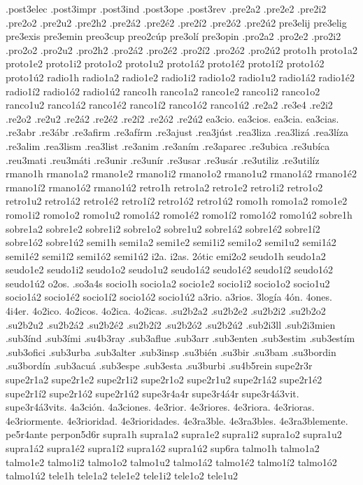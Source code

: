 {.post3elec
.post3impr
.post3ind
.post3ope
.post3rev
.pre2a2
.pre2e2
.pre2i2
.pre2o2
.pre2u2
.pre2h2
.pre2á2
.pre2é2
.pre2í2
.pre2ó2
.pre2ú2
pre3elij
pre3elig
pre3exis
pre3emin
preo3cup
preo2cúp
pre3olí
pre3opin
.pro2a2
.pro2e2
.pro2i2
.pro2o2
.pro2u2
.pro2h2
.pro2á2
.pro2é2
.pro2í2
.pro2ó2
.pro2ú2
proto1h
proto1a2 proto1e2 proto1i2 proto1o2 proto1u2
proto1á2 proto1é2 proto1í2 proto1ó2 proto1ú2
radio1h
radio1a2 radio1e2 radio1i2 radio1o2 radio1u2
radio1á2 radio1é2 radio1í2 radio1ó2 radio1ú2
ranco1h
ranco1a2 ranco1e2 ranco1i2 ranco1o2 ranco1u2
ranco1á2 ranco1é2 ranco1í2 ranco1ó2 ranco1ú2
.re2a2
.re3e4
.re2i2
.re2o2
.re2u2
.re2á2
.re2é2
.re2í2
.re2ó2
.re2ú2
ea3cio.
ea3cios.
ea3cia.
ea3cias.
.re3abr
.re3ábr
.re3afirm
.re3afírm
.re3ajust
.rea3júst
.rea3liza
.rea3lizá
.rea3líza
.re3alim
.rea3lism
.rea3list
.re3anim
.re3aním
.re3aparec
.re3ubica
.re3ubíca
.reu3mati
.reu3máti
.re3unir
.re3unír
.re3usar
.re3usár
.re3utiliz
.re3utilíz
rmano1h
rmano1a2 rmano1e2 rmano1i2 rmano1o2 rmano1u2
rmano1á2 rmano1é2 rmano1í2 rmano1ó2 rmano1ú2
retro1h
retro1a2 retro1e2 retro1i2 retro1o2 retro1u2
retro1á2 retro1é2 retro1í2 retro1ó2 retro1ú2
romo1h
romo1a2 romo1e2 romo1i2 romo1o2 romo1u2
romo1á2 romo1é2 romo1í2 romo1ó2 romo1ú2
sobre1h
sobre1a2 sobre1e2 sobre1i2 sobre1o2 sobre1u2
sobre1á2 sobre1é2 sobre1í2 sobre1ó2 sobre1ú2
semi1h
semi1a2 semi1e2 semi1i2 semi1o2 semi1u2
semi1á2 semi1é2 semi1í2 semi1ó2 semi1ú2
i2a.
i2as.
2ótic
emi2o2
seudo1h
seudo1a2 seudo1e2 seudo1i2 seudo1o2 seudo1u2
seudo1á2 seudo1é2 seudo1í2 seudo1ó2 seudo1ú2
o2os.
.so3a4s
socio1h
socio1a2 socio1e2 socio1i2 socio1o2 socio1u2
socio1á2 socio1é2 socio1í2 socio1ó2 socio1ú2
a3rio.
a3rios.
3logía
4ón.
4ones.
4i4er.
4o2ico.
4o2icos.
4o2ica.
4o2icas.
.su2b2a2
.su2b2e2
.su2b2i2
.su2b2o2
.su2b2u2
.su2b2á2
.su2b2é2
.su2b2í2
.su2b2ó2
.su2b2ú2
.sub2i3ll
.sub2i3mien
.sub3índ
.sub3ími
.su4b3ray
.sub3aflue
.sub3arr
.sub3enten
.sub3estim
.sub3estím
.sub3ofici
.sub3urba
.sub3alter
.sub3insp
.su3bién
.su3bir
.su3bam
.su3bordin
.su3bordín
.sub3acuá
.sub3espe
.sub3esta
.su3burbi
.su4b5rein
supe2r3r
supe2r1a2 supe2r1e2 supe2r1i2 supe2r1o2 supe2r1u2
supe2r1á2 supe2r1é2 supe2r1í2 supe2r1ó2 supe2r1ú2
supe3r4a4r
supe3r4á4r
supe3r4á3vit.
supe3r4á3vits.
4a3ción.
4a3ciones.
4e3rior.
4e3riores.
4e3riora.
4e3rioras.
4e3riormente.
4e3rioridad.
4e3rioridades.
4e3ra3ble.
4e3ra3bles.
4e3ra3blemente.
pe5r4ante
perpon5d6r
supra1h
supra1a2 supra1e2 supra1i2 supra1o2 supra1u2
supra1á2 supra1é2 supra1í2 supra1ó2 supra1ú2
sup6ra
talmo1h
talmo1a2 talmo1e2 talmo1i2 talmo1o2 talmo1u2
talmo1á2 talmo1é2 talmo1í2 talmo1ó2 talmo1ú2
tele1h
tele1a2 tele1e2 tele1i2 tele1o2 tele1u2
}
